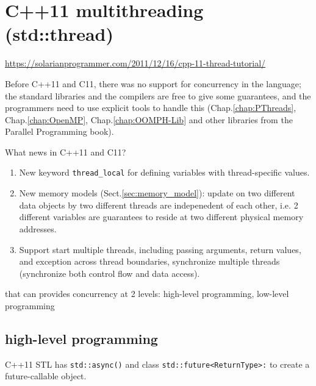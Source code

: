 \chapter{C++11 multithreading (std::thread)}
\label{chap:multithreading_C++11}

\url{https://solarianprogrammer.com/2011/12/16/cpp-11-thread-tutorial/}

Before C++11 and C11, there was no support for concurrency in the language; the
standard libraries and the compilers are free to give some guarantees, and the
programmers need to use explicit tools to handle this
(Chap.\ref{chap:PThreads}, Chap.\ref{chap:OpenMP}, Chap.\ref{chap:OOMPH-Lib}
and other libraries from the Parallel Programming book).

What news in C++11 and C11?
\begin{enumerate}  
  \item New keyword \verb!thread_local! for defining variables with
  thread-specific values.
  
  \item New memory models (Sect.\ref{sec:memory_model}): update on two different
  data objects by two different threads are indepenedent of each other, i.e. 2
  different variables are guarantees to reside at two different physical  memory
  addresses.
   
  \item Support start multiple threads, including passing arguments, return
  values, and exception across thread boundaries, synchronize multiple threads
  (synchronize both control flow and data access).
\end{enumerate}
that can provides concurrency at 2 levels: high-level programming, low-level
programming

\section{high-level programming}

C++11 STL has \verb!std::async()! and class \verb!std::future<ReturnType>:! to
create a future-callable object.

